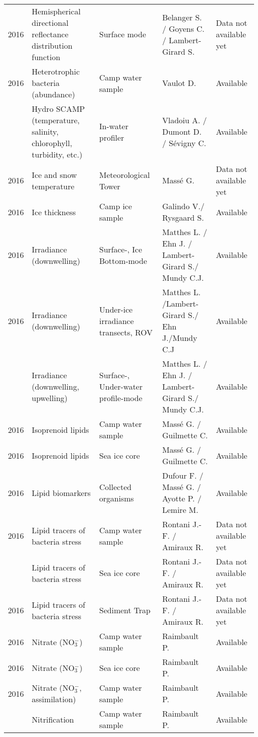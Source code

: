 \documentclass[]{article}
\begin{document}
\begin{landscape}
\begin{longtable}[t]{rllll}
2016 & Hemispherical directional reflectance distribution function & Surface mode & Belanger S. / Goyens C. / Lambert-Girard S. & Data not available yet\\
2016 & Heterotrophic bacteria (abundance) & Camp water sample & Vaulot D. & Available\\
\addlinespace
2016 & Hydro SCAMP (temperature, salinity, chlorophyll, turbidity, etc.) & In-water profiler & Vladoiu A. / Dumont D. / Sévigny C. & Available\\
2016 & Ice and snow temperature & Meteorological Tower & Massé G. & Data not available yet\\
2016 & Ice thickness & Camp ice sample & Galindo V./ Rysgaard S. & Available\\
2016 & Irradiance (downwelling) & Surface-, Ice Bottom-mode & Matthes L. / Ehn J. / Lambert-Girard S./ Mundy C.J. & Available\\
2016 & Irradiance (downwelling) & Under-ice irradiance transects, ROV & Matthes L. /Lambert-Girard S./ Ehn J./Mundy C.J & Available\\
\addlinespace
2016 & Irradiance (downwelling, upwelling) & Surface-, Under-water profile-mode & Matthes L. / Ehn J. / Lambert-Girard S./ Mundy C.J. & Available\\
2016 & Isoprenoid lipids & Camp water sample & Massé G. / Guilmette C. & Available\\
2016 & Isoprenoid lipids & Sea ice core & Massé G. / Guilmette C. & Available\\
2016 & Lipid biomarkers & Collected organisms & Dufour F. / Massé G. / Ayotte P. / Lemire M. & Available\\
2016 & Lipid tracers of bacteria stress & Camp water sample & Rontani J.-F. / Amiraux R. & Data not available yet\\
\addlinespace
2016 & Lipid tracers of bacteria stress & Sea ice core & Rontani J.-F. / Amiraux R. & Data not available yet\\
2016 & Lipid tracers of bacteria stress & Sediment Trap & Rontani J.-F. / Amiraux R. & Data not available yet\\
2016 & Nitrate (NO$^-_3$) & Camp water sample & Raimbault P. & Available\\
2016 & Nitrate (NO$^-_3$) & Sea ice core & Raimbault P. & Available\\
2016 & Nitrate (NO$^-_3$, assimilation) & Camp water sample & Raimbault P. & Available\\
\addlinespace
2016 & Nitrification & Camp water sample & Raimbault P. & Available\\

\end{longtable}
\end{landscape}
\end{document}
